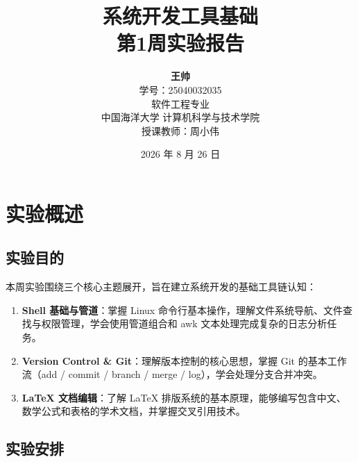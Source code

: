 \documentclass[12pt,a4paper]{article}
\begin{document}
\title{系统开发工具基础 \\[0.3cm] \large 第1周实验报告}
\author{
    \textbf{王\quad 帅} \\[0.2cm]
    \normalsize 学号：25040032035 \\
    \normalsize 软件工程专业 \\
    \normalsize 中国海洋大学 计算机科学与技术学院 \\[0.2cm]
    \normalsize 授课教师：周小伟
}
\date{2026 年 8 月 26 日}

\maketitle
\vspace{-1cm}

\tableofcontents
\newpage


\section{实验概述}

\subsection{实验目的}

本周实验围绕三个核心主题展开，旨在建立系统开发的基础工具链认知：

\begin{enumerate}[label=\textbf{(\arabic*)}]
    \item \textbf{Shell 基础与管道}：掌握 Linux 命令行基本操作，理解文件系统导航、文件查找与权限管理，学会使用管道组合和 awk 文本处理完成复杂的日志分析任务。
    \item \textbf{Version Control \& Git}：理解版本控制的核心思想，掌握 Git 的基本工作流（add / commit / branch / merge / log），学会处理分支合并冲突。
    \item \textbf{LaTeX 文档编辑}：了解 LaTeX 排版系统的基本原理，能够编写包含中文、数学公式和表格的学术文档，并掌握交叉引用技术。
\end{enumerate}

\subsection{实验安排}
\end{document}
